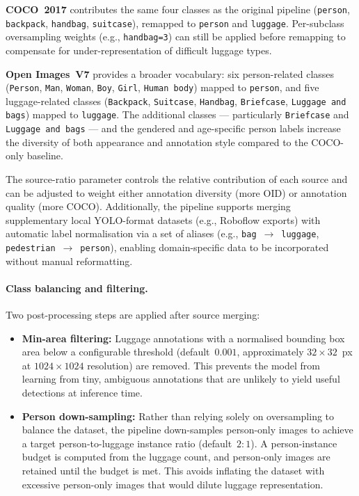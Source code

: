 \textbf{COCO~2017} contributes the same four classes as the original pipeline
(\texttt{person}, \texttt{backpack}, \texttt{handbag}, \texttt{suitcase}),
remapped to \texttt{person} and \texttt{luggage}. Per-subclass oversampling
weights (e.g., \texttt{handbag=3}) can still be applied before remapping to
compensate for under-representation of difficult luggage types.

\textbf{Open Images~V7} provides a broader vocabulary: six person-related
classes (\texttt{Person}, \texttt{Man}, \texttt{Woman}, \texttt{Boy},
\texttt{Girl}, \texttt{Human body}) mapped to \texttt{person}, and five
luggage-related classes (\texttt{Backpack}, \texttt{Suitcase},
\texttt{Handbag}, \texttt{Briefcase}, \texttt{Luggage and bags}) mapped to
\texttt{luggage}. The additional classes --- particularly \texttt{Briefcase}
and \texttt{Luggage and bags} --- and the gendered and age-specific person
labels increase the diversity of both appearance and annotation style compared
to the COCO-only baseline.

The source-ratio parameter controls the relative contribution of each source
and can be adjusted to weight either annotation diversity (more OID) or
annotation quality (more COCO). Additionally, the pipeline supports merging
supplementary local YOLO-format datasets (e.g., Roboflow exports) with
automatic label normalisation via a set of aliases (e.g.,
\texttt{bag}~$\to$~\texttt{luggage},
\texttt{pedestrian}~$\to$~\texttt{person}), enabling domain-specific data to be
incorporated without manual reformatting.

\paragraph{Class balancing and filtering.}

Two post-processing steps are applied after source merging:

\begin{itemize}
	\item \textbf{Min-area filtering:} Luggage annotations with a normalised
	      bounding box area below a configurable threshold (default~$0.001$,
	      approximately $32\times32$~px at $1024\times1024$ resolution) are
	      removed. This prevents the model from learning from tiny, ambiguous
	      annotations that are unlikely to yield useful detections at inference
	      time.
	\item \textbf{Person down-sampling:} Rather than relying solely on
	      oversampling to balance the dataset, the pipeline down-samples
	      person-only images to achieve a target person-to-luggage instance
	      ratio (default~$2{:}1$). A person-instance budget is computed from
	      the luggage count, and person-only images are retained until the
	      budget is met. This avoids inflating the dataset with excessive
	      person-only images that would dilute luggage representation.
\end{itemize}

